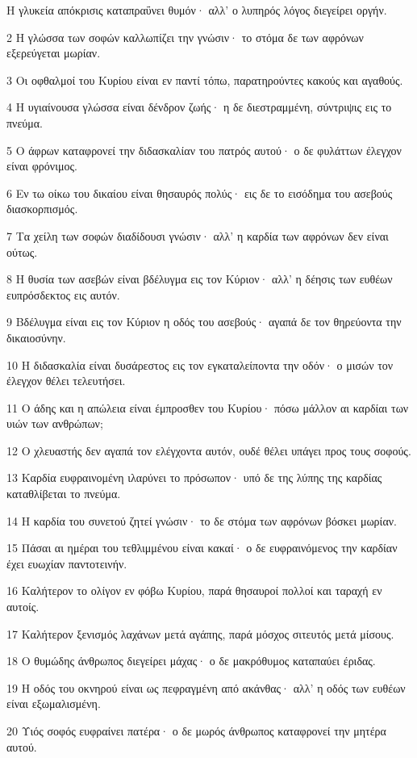 \par Η γλυκεία απόκρισις καταπραΰνει θυμόν· αλλ' ο λυπηρός λόγος διεγείρει οργήν.
\par 2 Η γλώσσα των σοφών καλλωπίζει την γνώσιν· το στόμα δε των αφρόνων εξερεύγεται μωρίαν.
\par 3 Οι οφθαλμοί του Κυρίου είναι εν παντί τόπω, παρατηρούντες κακούς και αγαθούς.
\par 4 Η υγιαίνουσα γλώσσα είναι δένδρον ζωής· η δε διεστραμμένη, σύντριψις εις το πνεύμα.
\par 5 Ο άφρων καταφρονεί την διδασκαλίαν του πατρός αυτού· ο δε φυλάττων έλεγχον είναι φρόνιμος.
\par 6 Εν τω οίκω του δικαίου είναι θησαυρός πολύς· εις δε το εισόδημα του ασεβούς διασκορπισμός.
\par 7 Τα χείλη των σοφών διαδίδουσι γνώσιν· αλλ' η καρδία των αφρόνων δεν είναι ούτως.
\par 8 Η θυσία των ασεβών είναι βδέλυγμα εις τον Κύριον· αλλ' η δέησις των ευθέων ευπρόσδεκτος εις αυτόν.
\par 9 Βδέλυγμα είναι εις τον Κύριον η οδός του ασεβούς· αγαπά δε τον θηρεύοντα την δικαιοσύνην.
\par 10 Η διδασκαλία είναι δυσάρεστος εις τον εγκαταλείποντα την οδόν· ο μισών τον έλεγχον θέλει τελευτήσει.
\par 11 Ο άδης και η απώλεια είναι έμπροσθεν του Κυρίου· πόσω μάλλον αι καρδίαι των υιών των ανθρώπων;
\par 12 Ο χλευαστής δεν αγαπά τον ελέγχοντα αυτόν, ουδέ θέλει υπάγει προς τους σοφούς.
\par 13 Καρδία ευφραινομένη ιλαρύνει το πρόσωπον· υπό δε της λύπης της καρδίας καταθλίβεται το πνεύμα.
\par 14 Η καρδία του συνετού ζητεί γνώσιν· το δε στόμα των αφρόνων βόσκει μωρίαν.
\par 15 Πάσαι αι ημέραι του τεθλιμμένου είναι κακαί· ο δε ευφραινόμενος την καρδίαν έχει ευωχίαν παντοτεινήν.
\par 16 Καλήτερον το ολίγον εν φόβω Κυρίου, παρά θησαυροί πολλοί και ταραχή εν αυτοίς.
\par 17 Καλήτερον ξενισμός λαχάνων μετά αγάπης, παρά μόσχος σιτευτός μετά μίσους.
\par 18 Ο θυμώδης άνθρωπος διεγείρει μάχας· ο δε μακρόθυμος καταπαύει έριδας.
\par 19 Η οδός του οκνηρού είναι ως πεφραγμένη από ακάνθας· αλλ' η οδός των ευθέων είναι εξωμαλισμένη.
\par 20 Υιός σοφός ευφραίνει πατέρα· ο δε μωρός άνθρωπος καταφρονεί την μητέρα αυτού.
